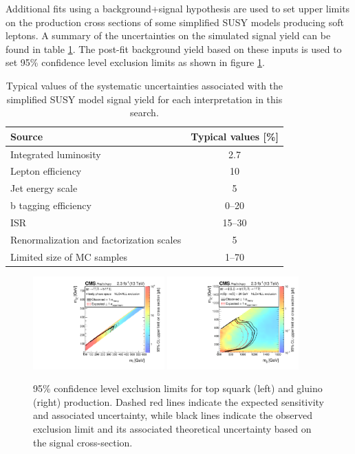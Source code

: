 Additional fits using a background+signal hypothesis are used to set upper limits on the production cross sections of some simplified SUSY models producing soft leptons. A summary of the uncertainties on the simulated signal yield can be found in table \ref{tbl:softsignalSyst}. The post-fit background yield based on these inputs is used to set 95\% confidence level exclusion limits as shown in figure \ref{fig:softlimits}.

\begin{table}
	\centering
	\caption{Typical values of the systematic uncertainties associated with the simplified SUSY model signal yield for each interpretation in this search.}
	\begin{tabular}{l|c}
\hline
Source & Typical values [\%]  \\
\hline
Integrated luminosity & 2.7  \\
Lepton efficiency & 10  \\
Jet energy scale & 5  \\
b tagging efficiency & 0--20  \\
ISR & 15--30  \\
Renormalization  and factorization scales & 5  \\
Limited size of MC samples & 1--70  \\
\hline
	\end{tabular}
	\label{tbl:softsignalSyst}
\end{table}
\begin{figure}
	\centering
	\includegraphics[width=0.45\textwidth]{soft/figs/T2-4bdXSEC}
	\includegraphics[width=0.45\textwidth]{soft/figs/T5qqqqWWXSEC}
	\caption{95\% confidence level exclusion limits for top squark (left) and gluino (right) production. Dashed red lines indicate the expected sensitivity and associated uncertainty, while black lines indicate the observed exclusion limit and its associated theoretical uncertainty based on the signal cross-section.}
	\label{fig:softlimits}
\end{figure}

